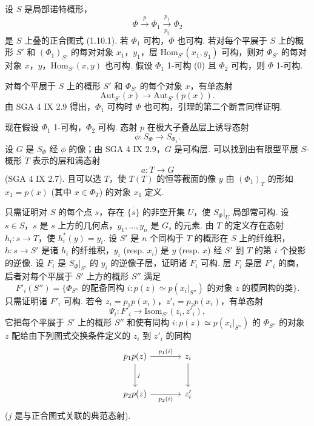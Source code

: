 \begin{lemma}\label{lem:XIII.3.1.1}
设 $S$ 是局部诺特概形，
\[
\Phi \xrightarrow{p} \Phi_1 \xrightarrow[p_2]{p_1} \Phi_2
\]
是 $S$ 上叠的正合图式 (1.10.1). 若 $\Phi_1$ 可构，$\Phi$ 也可构. 若对每个平展于 $S$ 上的概形 $S'$ 和 $(\Phi_1)_{S'}$ 的每对对象 $x_1$，$y_1$，层 $\mathrm{Hom}_{S'}(x_1, y_1)$ 可构，则对 $\Phi_{S'}$ 的每对对象 $x$，$y$，$\mathrm{Hom}_{S'}(x, y)$ 也可构. 假设 $\Phi_1$ 1-可构 (0) 且 $\Phi_2$ 可构，则 $\Phi$ 1-可构.
\end{lemma}

对每个平展于 $S$ 上的概形 $S'$ 和 $\Phi_{S'}$ 的每个对象 $x$，有单态射
\[
\mathrm{Aut}_{S'}(x) \longrightarrow \mathrm{Aut}_{S'}(p(x)).
\]
由 SGA 4 IX 2.9 得出，$\Phi_1$ 可构时 $\Phi$ 也可构，引理的第二个断言同样证明.

现在假设 $\Phi_1$ 1-可构，$\Phi_2$ 可构. 态射 $p$ 在极大子叠丛层上诱导态射
\[
\phi \colon S_\Phi \longrightarrow S_{\Phi_1}.
\]
设 $G$ 是 $S_\Phi$ 经 $\phi$ 的像；由 SGA 4 IX 2.9，$G$ 是可构层. 可以找到由有限型平展 $S$-概形 $T$ 表示的层和满态射
\[
a \colon T \longrightarrow G
\]
(SGA 4 IX 2.7). 且可以选 $T$，使 $T(T)$ 的恒等截面的像 $y$ 由 $(\Phi_1)_T$ 的形如 $x_1 = p(x)$ (其中 $x \in \Phi_T$) 的对象 $x_1$ 定义.

只需证明对 $S$ 的每个点 $s$，存在 $\overline{\{s\}}$ 的非空开集 $U$，使 $S_\Phi|_U$ 局部常可构. 设 $s \in S$，$s$ 是 $s$ 上方的几何点，$y_1, \ldots, y_n$ 是 $G_s$ 的元素. 由 $T$ 的定义存在态射 $h_i \colon s \to T$，使 $h^{*}_i(y) = y_i$. 设 $S'$ 是 $n$ 个同构于 $T$ 的概形在 $S$ 上的纤维积，$h \colon s \to S'$ 是诸 $h_i$ 的纤维积，$y_i$ (resp. $x_i$) 是 $y$ (resp. $x$) 经 $S'$ 到 $T$ 的第 $i$ 个投影的逆像. 设 $F_i$ 是 $S_\Phi|_{S'}$ 的 $y_i$ 的逆像子层，证明诸 $F_i$ 可构. 层 $F_i$ 是层 $F'_i$ 的商，后者对每个平展于 $S'$ 上方的概形 $S''$ 满足
\[
F'_i(S'') = \{\Phi_{S''} \text{ 的配备同构 } i \colon p(z) \simeq p(x_i|_{S''}) \text{ 的对象 } z \text{ 的模同构的类}\}.
\]
只需证明诸 $F'_i$ 可构. 若令 $z_i = p_1 p(x_i)$，$z'_i = p_2 p(x_i)$，有单态射
\[
\Psi_i \colon F'_i \longrightarrow \mathrm{Isom}_{S'}(z_i, z'_i),
\]
它把每个平展于 $S'$ 上的概形 $S''$ 和使有同构 $i \colon p(z) \simeq p(x_i|_{S''})$ 的 $\Phi_{S''}$ 的对象 $z$ 配给由下列图式交换条件定义的 $z_i$ 到 $z'_i$ 的同构
\[
\begin{tikzcd}[row sep=large, column sep=large]
p_1 p(z) \arrow[r,"{p_1(i)}"] \arrow[d,"{j}"] & z_i \arrow[d] \\
p_2 p(z) \arrow[r,"{p_2(i)}"'] & z'_i
\end{tikzcd}
\]
($j$ 是与正合图式关联的典范态射).

